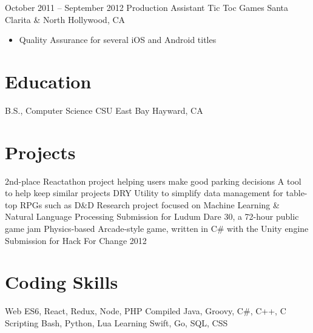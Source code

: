 \documentclass[11pt,a4paper,sans]{moderncv}        %
\begin{document}
\cventry
{October 2011 -- September 2012}	{Production Assistant}
{Tic Toc Games}	{Santa Clarita \& North Hollywood, CA}
{}
{
\begin{itemize}
    \item Quality Assurance for several iOS and Android titles
\end{itemize}
}   %

\section{Education}         %
         {B.S., Computer Science}
        {CSU East Bay}      {Hayward, CA}
        {}                  {}  %

\section{Projects}          %
                          {2nd-place Reactathon project helping users make good parking decisions}
                     {A tool to help keep similar projects DRY}
             {Utility to simplify data management for table-top RPGs such as D\&D}
                      {Research project focused on Machine Learning \& Natural Language Processing}
                  {Submission for Ludum Dare 30, a 72-hour public game jam}
                         {Physics-based Arcade-style game, written in C\# with the Unity engine}
	        {Submission for Hack For Change 2012}

\section{Coding Skills}     %
\cvdoubleitem
{Web}               {ES6, React, Redux, Node, PHP }
{Compiled}          {Java, Groovy, C\#, C++, C}
\cvdoubleitem
{Scripting}         {Bash, Python, Lua}
{Learning}          {Swift, Go, SQL, CSS}
\end{document}
